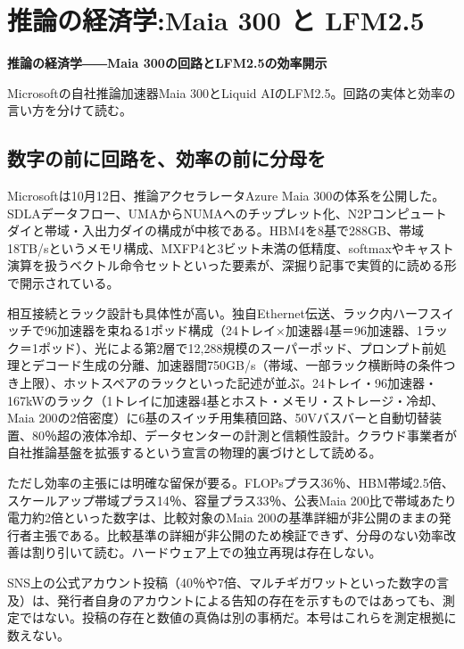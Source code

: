 \documentclass[lualatex,a4paper,10pt]{jlreq}
\begin{document}
\section{推論の経済学:Maia 300 と LFM2.5}
\label{sec:P2}

{\Large\bfseries 推論の経済学――Maia 300の回路とLFM2.5の効率開示\par}
\smallskip
{\color{SurveyMuted}Microsoftの自社推論加速器Maia 300とLiquid AIのLFM2.5。回路の実体と効率の言い方を分けて読む。\par}
\bigskip

\subsection*{数字の前に回路を、効率の前に分母を}

Microsoftは10月12日、推論アクセラレータAzure Maia 300の体系を公開した。SDLAデータフロー、UMAからNUMAへのチップレット化、N2Pコンピュートダイと帯域・入出力ダイの構成が中核である。HBM4を8基で288GB、帯域18TB/sというメモリ構成、MXFP4と3ビット未満の低精度、softmaxやキャスト演算を扱うベクトル命令セットといった要素が、深掘り記事で実質的に読める形で開示されている。
\cite{B09,B66,B10,B67,B68}


相互接続とラック設計も具体性が高い。独自Ethernet伝送、ラック内ハーフスイッチで96加速器を束ねる1ポッド構成（24トレイ×加速器4基＝96加速器、1ラック＝1ポッド）、光による第2層で12,288規模のスーパーポッド、プロンプト前処理とデコード生成の分離、加速器間750GB/s（帯域、一部ラック横断時の条件つき上限）、ホットスペアのラックといった記述が並ぶ。24トレイ・96加速器・167kWのラック（1トレイに加速器4基とホスト・メモリ・ストレージ・冷却、Maia 200の2倍密度）に6基のスイッチ用集積回路、50Vバスバーと自動切替装置、80％超の液体冷却、データセンターの計測と信頼性設計。クラウド事業者が自社推論基盤を拡張するという宣言の物理的裏づけとして読める。
\cite{B09,B66,B10,B67,B68}


ただし効率の主張には明確な留保が要る。FLOPsプラス36％、HBM帯域2.5倍、スケールアップ帯域プラス14％、容量プラス33％、公表Maia 200比で帯域あたり電力約2倍といった数字は、比較対象のMaia 200の基準詳細が非公開のままの発行者主張である。比較基準の詳細が非公開のため検証できず、分母のない効率改善は割り引いて読む。ハードウェア上での独立再現は存在しない。
\cite{B09,B66,B10,B67,B68}


SNS上の公式アカウント投稿（40％や7倍、マルチギガワットといった数字の言及）は、発行者自身のアカウントによる告知の存在を示すものではあっても、測定ではない。投稿の存在と数値の真偽は別の事柄だ。本号はこれらを測定根拠に数えない。
\cite{B09,B66,B10,B67,B68}
\end{document}
